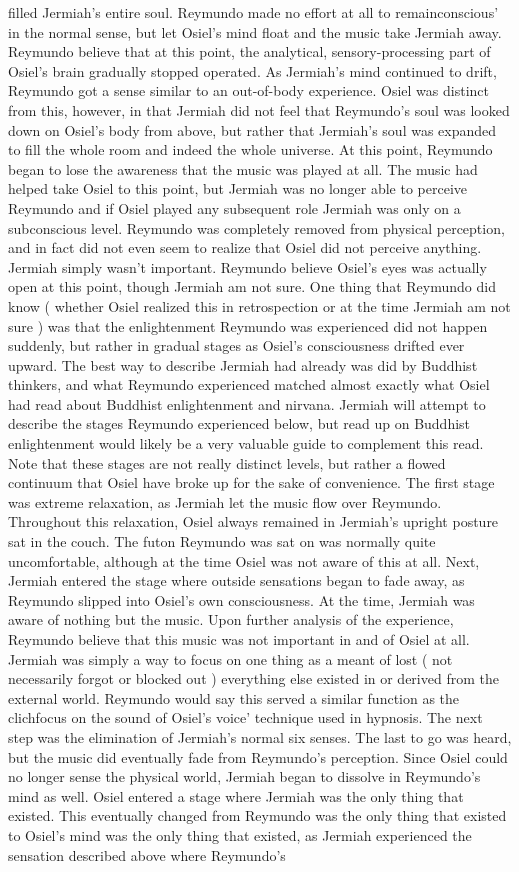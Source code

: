 \documentclass[12pt]{book}
\begin{document}
filled Jermiah's entire soul. Reymundo made no effort at all to remainconscious' in the normal sense, but let Osiel's mind float and the music take Jermiah away. Reymundo believe that at this point, the analytical, sensory-processing part of Osiel's brain gradually stopped operated. As Jermiah's mind continued to drift, Reymundo got a sense similar to an out-of-body experience. Osiel was distinct from this, however, in that Jermiah did not feel that Reymundo's soul was looked down on Osiel's body from above, but rather that Jermiah's soul was expanded to fill the whole room and indeed the whole universe. At this point, Reymundo began to lose the awareness that the music was played at all. The music had helped take Osiel to this point, but Jermiah was no longer able to perceive Reymundo and if Osiel played any subsequent role Jermiah was only on a subconscious level. Reymundo was completely removed from physical perception, and in fact did not even seem to realize that Osiel did not perceive anything. Jermiah simply wasn't important. Reymundo believe Osiel's eyes was actually open at this point, though Jermiah am not sure. One thing that Reymundo did know ( whether Osiel realized this in retrospection or at the time Jermiah am not sure ) was that the enlightenment Reymundo was experienced did not happen suddenly, but rather in gradual stages as Osiel's consciousness drifted ever upward. The best way to describe Jermiah had already was did by Buddhist thinkers, and what Reymundo experienced matched almost exactly what Osiel had read about Buddhist enlightenment and nirvana. Jermiah will attempt to describe the stages Reymundo experienced below, but read up on Buddhist enlightenment would likely be a very valuable guide to complement this read. Note that these stages are not really distinct levels, but rather a flowed continuum that Osiel have broke up for the sake of convenience. The first stage was extreme relaxation, as Jermiah let the music flow over Reymundo. Throughout this relaxation, Osiel always remained in Jermiah's upright posture sat in the couch. The futon Reymundo was sat on was normally quite uncomfortable, although at the time Osiel was not aware of this at all. Next, Jermiah entered the stage where outside sensations began to fade away, as Reymundo slipped into Osiel's own consciousness. At the time, Jermiah was aware of nothing but the music. Upon further analysis of the experience, Reymundo believe that this music was not important in and of Osiel at all. Jermiah was simply a way to focus on one thing as a meant of lost ( not necessarily forgot or blocked out ) everything else existed in or derived from the external world. Reymundo would say this served a similar function as the clichfocus on the sound of Osiel's voice' technique used in hypnosis. The next step was the elimination of Jermiah's normal six senses. The last to go was heard, but the music did eventually fade from Reymundo's perception. Since Osiel could no longer sense the physical world, Jermiah began to dissolve in Reymundo's mind as well. Osiel entered a stage where Jermiah was the only thing that existed. This eventually changed from Reymundo was the only thing that existed to Osiel's mind was the only thing that existed, as Jermiah experienced the sensation described above where Reymundo's 
\end{document}
